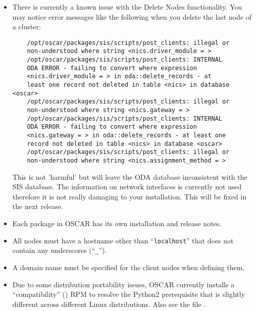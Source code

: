 \begin{itemize}

\item There is currently a known issue with the Delete Nodes functionality.
  You may notice error messages like the following when you delete the
  last node of a cluster:

  \begin{verbatim}
    /opt/oscar/packages/sis/scripts/post_clients: illegal or
    non-understood where string <nics.driver_module = >
    /opt/oscar/packages/sis/scripts/post_clients: INTERNAL
    ODA ERROR - failing to convert where expression
    <nics.driver_module = > in oda::delete_records - at 
    least one record not deleted in table <nics> in database <oscar>
    /opt/oscar/packages/sis/scripts/post_clients: illegal or
    non-understood where string <nics.gateway = >
    /opt/oscar/packages/sis/scripts/post_clients: INTERNAL
    ODA ERROR - failing to convert where expression
    <nics.gateway = > in oda::delete_records - at least one
    record not deleted in table <nics> in database <oscar>
    /opt/oscar/packages/sis/scripts/post_clients: illegal or
    non-understood where string <nics.assignment_method = >
  \end{verbatim}

  This is not 'harmful' but will leave the ODA database inconsistent
  with the SIS database.  The information on network interfaces is
  currently not used therefore it is not really damaging to your
  installation.  This will be fixed in the next release.


\item Each package in OSCAR has its own installation and release
  notes.   

\item All nodes must have a hostname other than ``{\tt localhost}''
  that does not contain any underscores (``{\tt \_}'').
  
\item A domain name must be specified for the client nodes when
  defining them.

\item Due to some distribution portability issues, OSCAR currently installs
  a ``compatibility''  () RPM to resolve the
  Python2 prerequisite that is slightly different across different Linux
  distributions.  Also see the file .


\end{itemize}
